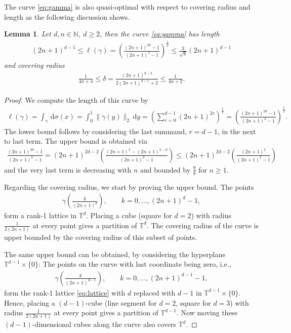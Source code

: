 \documentclass[11pt,a4paper,twoside,final,biblatex]{scrartcl}
\newcommand{\N}{\ensuremath{\mathbb{N}}}
\newcommand{\T}{\ensuremath{\mathbb{T}}}
\renewcommand{\d}{\,\mathrm{d}}
\newtheorem{lemma}[theorem]{Lemma}
\theoremstyle{definition}
\numberwithin{equation}{section}
\numberwithin{table}{section}
\numberwithin{figure}{section}
\begin{document}
The curve \eqref{eq:gamma} is also quasi-optimal with respect to covering radius and length as the following discussion shows.
\begin{lemma}\label{thm:gamma2}
 Let $d,n\in\N$, $d\ge 2$, then the curve \eqref{eq:gamma} has length
 \begin{align*}
    (2n+1)^{d-1}\le
    \ell(\gamma)
    =\left(\frac{(2n+1)^{2d}-1}{(2n+1)^2-1}\right)^{\frac12}
    \le \frac{3}{\sqrt{8}} (2n+1)^{d-1}
\end{align*}
and covering radius
\begin{align*}
    \frac{1}{4n+4} \le \delta = \frac{(2n+1)^{d-2}}{2(2n+1)^{d-1}+2} \le \frac{1}{4n+2}.
\end{align*}
\end{lemma}
\begin{proof}
We compute the length of this curve by
\begin{align*}
    \ell(\gamma)
    =\int_{\gamma}\d\sigma(x)
    =\int_0^1 \|\dot\gamma(y)\|_2\d y
    =\left(\sum_{r=0}^{d-1} (2n+1)^{2r}\right)^{\frac12}
    =\left(\frac{(2n+1)^{2d}-1}{(2n+1)^2-1}\right)^{\frac12}.
\end{align*}
The lower bound follows by considering the last summand, $r=d-1$, in the next to last term.
The upper bound is obtained via
\begin{align*}
 \frac{(2n+1)^{2d}-1}{(2n+1)^2-1}
 =(2n+1)^{2d-2}\left(\frac{(2n+1)^{2}-(2n+1)^{2-d}}{(2n+1)^2-1}\right)
 \le (2n+1)^{2d-2}\left(\frac{(2n+1)^{2}}{(2n+1)^2-1}\right)
\end{align*}
and the very last term is decreasing with $n$ and bounded by $\frac{9}{8}$ for $n\ge 1$.

Regarding the covering radius, we start by proving the upper bound. The points
\begin{align}\label{eq:lattice}
 \gamma\left(\frac{k}{(2n+1)^{d}}\right),\qquad k=0,\hdots,(2n+1)^{d}-1,
\end{align}
form a rank-1 lattice in $\T^{d}$. Placing a cube (square for $d=2$) with radius $\frac{1}{2(2n+1)}$ at every point gives a partition of $\T^{d}$. The covering radius of the curve is upper bounded by the covering radius of this subset of points.

The same upper bound can be obtained, by considering the hyperplane $\T^{d-1}\times\{0\}$: The points on the curve with last coordinate being zero, i.e.,
\begin{align*}
 \gamma\left(\frac{k}{(2n+1)^{d-1}}\right),\qquad k=0,\hdots,(2n+1)^{d-1}-1,
\end{align*}
form the rank-1 lattice \eqref{eq:lattice} with $d$ replaced with $d-1$ in $\T^{d-1}\times\{0\}$.
Hence, placing a $(d-1)$-cube (line segment for $d=2$, square for $d=3$) with radius $\frac{1}{2(2n+1)}$ at every point gives a partition of $\T^{d-1}$. Now moving these $(d-1)$-dimensional cubes along the curve also covers $\T^d$.


\end{proof}
\end{document}
